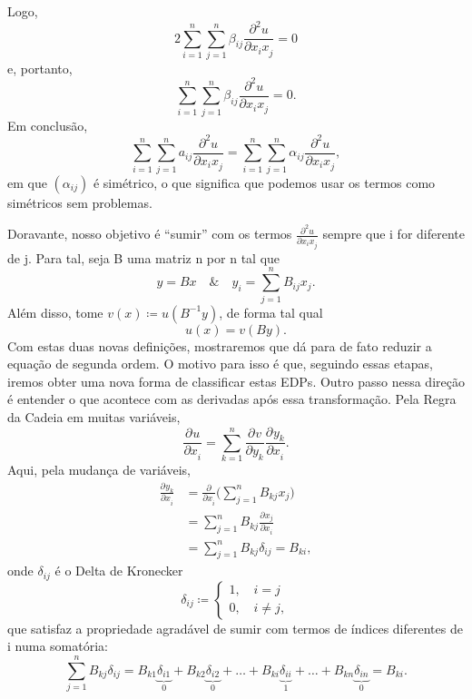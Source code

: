 \documentclass[.../pde_notes.tex]{subfiles}
\begin{document}
Logo,
\[
	2\sum\limits_{i=1}^{n}\sum\limits_{j=1}^{n}\beta_{ij}\frac{\partial^{2}u}{\partial x_{i}x_{j}^{}} = 0
\]
e, portanto,
\[
	\sum\limits_{i=1}^{n}\sum\limits_{j=1}^{n}\beta_{ij}\frac{\partial^{2}u}{\partial x_{i}x_{j}^{}} = 0.
\]
Em conclusão,
\[
	\sum\limits_{i=1}^{n}\sum\limits_{j=1}^{n}a_{ij}\frac{\partial^{2}u}{\partial x_{i}x_{j}^{}} = \sum\limits_{i=1}^{n}\sum\limits_{j=1}^{n}\alpha_{ij}\frac{\partial^{2}u}{\partial x_{i}x_{j}^{}},
\]
em que \((\alpha_{ij})\) é simétrico, o que significa que podemos usar os termos como simétricos sem problemas.

Doravante, nosso objetivo é ``sumir'' com os termos \(\frac{\partial^{2}u}{\partial x_{i}x_{j}^{}}\) sempre que i for diferente de j. Para tal,
seja B uma matriz n por n tal que
\[
	y = Bx \quad\&\quad y_{i} = \sum\limits_{j=1}^{n}B_{ij}x_{j}.
\]
Além disso, tome \(v(x)\coloneqq u(B^{-1}y)\), de forma tal qual
\[
	u(x) = v(By).
\]
Com estas duas novas definições, mostraremos que dá para de fato reduzir a equação de segunda ordem. O motivo para isso é que, seguindo essas etapas, iremos obter uma nova forma de classificar estas EDPs. Outro passo nessa direção é entender o que acontece
com as derivadas após essa transformação. Pela Regra da Cadeia em muitas variáveis,
\[
	\frac{\partial^{}u}{\partial x_{i}^{}} = \sum\limits_{k=1}^{n}\frac{\partial^{}v}{\partial y_{k}^{}}\frac{\partial^{}y_{k}}{\partial x_{i}^{}}.
\]
Aqui, pela mudança de variáveis,
\begin{align*}
	\frac{\partial^{}y_{k}}{\partial x_{i}^{}} & = \frac{\partial^{}}{\partial x_{i}^{}}\biggl(\sum\limits_{j=1}^{n}B_{kj}x_{j}\biggr) \\
	                                           & = \sum\limits_{j=1}^{n}B_{kj}\frac{\partial^{}x_{j}}{\partial x_{i}^{}}               \\
	                                           & = \sum\limits_{j=1}^{n}B_{kj}\delta_{ij} = B_{ki},
\end{align*}
onde \(\delta_{ij}\) é o Delta de Kronecker
\[
	\delta_{ij}\coloneqq \left\{\begin{array}{ll}
		1,\quad i = j \\
		0,\quad i \neq j,
	\end{array}\right.
\]
que satisfaz a propriedade agradável de sumir com termos de índices diferentes de i numa somatória:
\[
	\sum\limits_{j=1}^{n}B_{kj}\delta_{ij} = B_{k1}\underbrace{\delta_{i1}}_{0} + B_{k2}\underbrace{\delta_{i2}}_{0} + \dotsc + B_{ki}\underbrace{\delta_{ii}}_{1} + \dotsc + B_{kn}\underbrace{\delta_{in}}_{0} = B_{ki}.
\]
\end{document}
